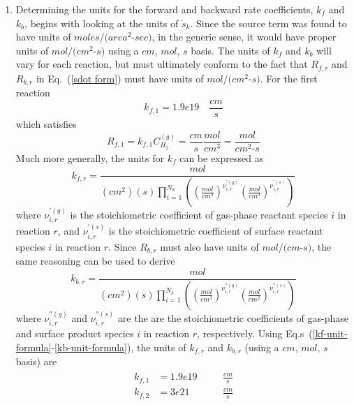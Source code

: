 \documentclass[a4paper]{report}
\newcommand{\eref}[1]{Eq.~(\ref{#1})}
\newcommand{\erefs}[2]{Eq.s~(\ref{#1}-\ref{#2})}
\newcommand{\sk}{\dot{s}_k}
\newcommand{\kf}[1]{k_{f,#1}}
\newcommand{\kb}[1]{k_{b,#1}}
\newcommand{\cg}[1]{{C_{#1}^{(g)}}}
\begin{document}
\begin{enumerate}
\item Determining the units for the forward and backward rate coefficients,
  $k_f$ and $k_b$, begins with looking at the units of $\sk$.  Since the source
  term was found to have units of $moles/(area^2$-$sec)$, in the generic sense, it
  would have proper units of $mol/(cm^2$-$s)$ using a $cm$, $mol$, $s$ basis.
  The units of $k_f$ and $k_b$ will vary for each reaction, but must ultimately
  conform to the fact that $R_{f,r}$ and $R_{b,r}$ in \eref{sdot form} must have
  units of $mol/(cm^2$-$s)$.  For the first reaction
  \begin{equation}
    \kf{1} = 1.9e19 \quad \frac{cm}{s}
    \label{kf_units}
  \end{equation}
  which satisfies
  \begin{equation}
    R_{f,1} = k_{f,1}\cg{H_2} = \frac{cm}{s}\frac{mol}{cm^3} =
    \frac{mol}{cm^2\text{-}s}
    \label{R_units}
  \end{equation}
 Much more generally, the units for $k_f$ can be expressed as
  \begin{equation}
    \kf{r} = \frac{mol}{(cm^2)(s)\prod_{i=1}^{N_k}\left(
    \left( \frac{mol}{cm^3} \right)^{\nu_{i,r}^{'(g)}} \left( \frac{mol}{cm^2}
    \right)^{\nu_{i,r}^{'(s)}} \right)}
    \label{kf-unit-formula}
  \end{equation}
  where $\nu_{i,r}^{'(g)}$ is the stoichiometric coefficient of gas-phase
  reactant species $i$ in reaction $r$, and $\nu_{i,r}^{'(s)}$ is the
  stoichiometric coefficient of surface reactant species $i$ in reaction $r$.
  Since $R_{b,r}$ must also have units of $mol/(cm$-$s)$, the same reasoning can
  be used to derive
  \begin{equation}
    \kb{r} = \frac{mol}{(cm^2)(s)\prod_{i=1}^{N_k}\left(
    \left( \frac{mol}{cm^3} \right)^{\nu_{i,r}^{''(g)}} \left( \frac{mol}{cm^2}
    \right)^{\nu_{i,r}^{''(s)}} \right)}
    \label{kb-unit-formula}
  \end{equation}
  where $\nu_{i,r}^{''(g)}$ and $\nu_{i,r}^{''(s)}$ are the are the
  stoichiometric coefficients of gas-phase and surface product species $i$ in
  reaction $r$, respectively.  Using \erefs{kf-unit-formula}{kb-unit-formula},
  the units of $\kf{r}$ and $\kb{r}$ (using a $cm$, $mol$, $s$ basis) are
  \begin{align}
    \begin{alignedat}{2}
      \kf{1} &= 1.9e19 && \quad \frac{cm}{s} \\
      \kf{2} &= 3e21   && \quad \frac{cm}{s} \\

\end{alignedat}
\end{align}
\end{enumerate}
\end{document}
